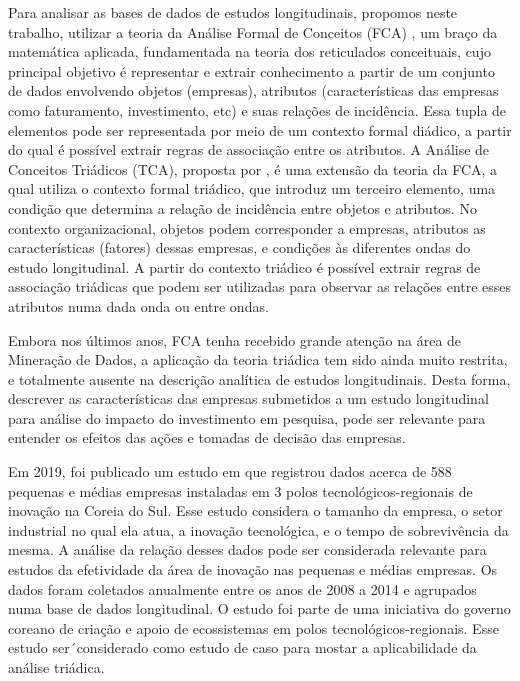 \documentclass[kdmile,a4paper]{kdmile} %
\begin{document}
Para analisar as bases de dados de estudos longitudinais, propomos neste trabalho, utilizar a teoria da Análise Formal de Conceitos (FCA) \cite{ganter2012formal}, um braço da matemática aplicada, fundamentada na teoria dos reticulados conceituais, cujo principal objetivo é representar e extrair conhecimento a partir de um conjunto de dados envolvendo objetos (empresas), atributos (características das empresas como faturamento, investimento, etc) e suas relações de incidência. Essa tupla de elementos pode ser representada por meio de um contexto formal diádico, a partir do qual é possível extrair regras de associação  entre os atributos. A Análise de Conceitos Triádicos (TCA), proposta por \cite{lehmann:95}, é uma extensão da teoria da FCA, a qual utiliza o contexto formal triádico, que introduz um terceiro elemento, uma condição que determina a relação de incidência entre objetos e atributos. No contexto organizacional, objetos podem corresponder a empresas, atributos as características (fatores) dessas empresas, e condições às diferentes ondas do estudo longitudinal. A partir do contexto triádico é possível extrair regras de associação triádicas que podem ser utilizadas para observar as relações entre esses atributos numa dada onda ou entre ondas. 

Embora nos últimos anos, FCA tenha recebido grande atenção na área de Mineração de Dados, a aplicação da teoria triádica tem sido ainda muito restrita, e totalmente ausente na descrição analítica de estudos longitudinais. Desta forma, descrever as características das empresas submetidos a um estudo longitudinal para análise do impacto do investimento em pesquisa, pode ser relevante para entender os efeitos das ações e tomadas de decisão das empresas.

Em 2019, foi publicado um estudo em \cite{KIM2019103967} que registrou dados acerca de 588 pequenas e médias empresas instaladas em 3 polos tecnológicos-regionais de inovação na Coreia do Sul. Esse estudo considera o tamanho da empresa, o setor industrial no qual ela atua, a inovação tecnológica, e o tempo de sobrevivência da mesma. A análise da relação desses dados pode ser considerada relevante para estudos da efetividade da área de inovação nas pequenas e médias empresas. Os dados foram coletados anualmente entre os anos de 2008 a 2014 e agrupados numa base de dados longitudinal. O estudo foi parte de uma iniciativa do governo coreano de criação e apoio de ecossistemas em polos tecnológicos-regionais. Esse estudo ser´considerado como estudo de caso para mostar a aplicabilidade da análise triádica.
\end{document}

